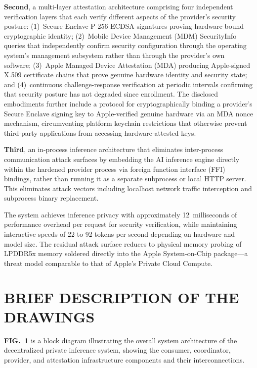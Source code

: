 \documentclass[11pt,letterpaper]{article}
\begin{document}
\textbf{Second}, a multi-layer attestation architecture comprising four independent verification layers that each verify different aspects of the provider's security posture: (1)~Secure Enclave P-256 ECDSA signatures proving hardware-bound cryptographic identity; (2)~Mobile Device Management (MDM) SecurityInfo queries that independently confirm security configuration through the operating system's management subsystem rather than through the provider's own software; (3)~Apple Managed Device Attestation (MDA) producing Apple-signed X.509 certificate chains that prove genuine hardware identity and security state; and (4)~continuous challenge-response verification at periodic intervals confirming that security posture has not degraded since enrollment. The disclosed embodiments further include a protocol for cryptographically binding a provider's Secure Enclave signing key to Apple-verified genuine hardware via an MDA nonce mechanism, circumventing platform keychain restrictions that otherwise prevent third-party applications from accessing hardware-attested keys.

\textbf{Third}, an in-process inference architecture that eliminates inter-process communication attack surfaces by embedding the AI inference engine directly within the hardened provider process via foreign function interface (FFI) bindings, rather than running it as a separate subprocess or local HTTP server. This eliminates attack vectors including localhost network traffic interception and subprocess binary replacement.

The system achieves inference privacy with approximately 12~milliseconds of performance overhead per request for security verification, while maintaining interactive speeds of 22 to 92 tokens per second depending on hardware and model size. The residual attack surface reduces to physical memory probing of LPDDR5x memory soldered directly into the Apple System-on-Chip package---a threat model comparable to that of Apple's Private Cloud Compute.

\section{BRIEF DESCRIPTION OF THE DRAWINGS}

\textbf{FIG.~1} is a block diagram illustrating the overall system architecture of the decentralized private inference system, showing the consumer, coordinator, provider, and attestation infrastructure components and their interconnections.
\end{document}
